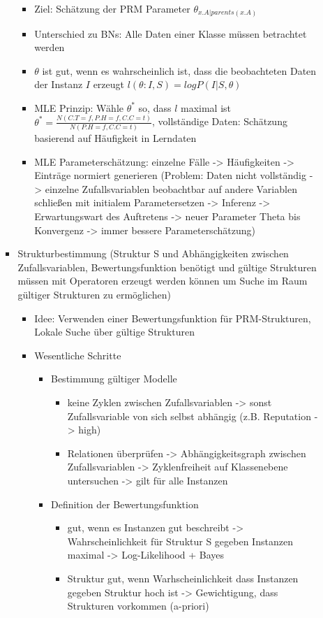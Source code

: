 \documentclass[paper=a4, fontsize=11pt]{scrartcl} %
\numberwithin{equation}{section} %
\numberwithin{figure}{section} %
\numberwithin{table}{section} %
\begin{document}
\begin{itemize}
\begin{itemize}
\begin{itemize}
\begin{itemize}
\item Ziel: Schätzung der PRM Parameter $\theta_{x.A|parents(x.A)}$
\item Unterschied zu BNs: Alle Daten einer Klasse müssen betrachtet werden
\item $\theta$ ist gut, wenn es wahrscheinlich ist, dass die beobachteten Daten der Instanz $I$ erzeugt $l(\theta:I,S) = log P(I|S,\theta)$
\item MLE Prinzip: Wähle $\theta^*$ so, dass $l$ maximal ist $\theta^* = \frac{N(C.T=f,P.H=f,C.C=t)}{N(P.H=f,C.C=t)}$, vollständige Daten: Schätzung basierend auf Häufigkeit in Lerndaten
\item MLE Parameterschätzung: einzelne Fälle -> Häufigkeiten -> Einträge normiert generieren (Problem: Daten nicht vollständig -> einzelne Zufallsvariablen beobachtbar auf andere Variablen schließen mit initialem Parametersetzen -> Inferenz -> Erwartungswart des Auftretens -> neuer Parameter Theta bis Konvergenz -> immer bessere Parameterschätzung)
\end{itemize}
\item Strukturbestimmung (Struktur S und Abhängigkeiten zwischen Zufallsvariablen, Bewertungsfunktion benötigt und gültige Strukturen müssen mit Operatoren erzeugt werden können um Suche im Raum gültiger Strukturen zu ermöglichen)
\begin{itemize}
\item Idee: Verwenden einer Bewertungsfunktion für PRM-Strukturen, Lokale Suche über gültige Strukturen
\item Wesentliche Schritte
\begin{itemize}
\item Bestimmung gültiger Modelle
\begin{itemize}
\item keine Zyklen zwischen Zufallsvariablen -> sonst Zufallsvariable von sich selbst abhängig (z.B. Reputation -> high)
\item Relationen überprüfen -> Abhängigkeitsgraph zwischen Zufallsvariablen -> Zyklenfreiheit auf Klassenebene untersuchen -> gilt für alle Instanzen
\end{itemize}
\item Definition der Bewertungsfunktion
\begin{itemize}
\item gut, wenn es Instanzen gut beschreibt -> Wahrscheinlichkeit für Struktur S gegeben Instanzen maximal -> Log-Likelihood + Bayes
\item Struktur gut, wenn Warhscheinlichkeit dass Instanzen gegeben Struktur hoch ist -> Gewichtigung, dass Strukturen vorkommen (a-priori)

\end{itemize}
\end{itemize}
\end{itemize}
\end{itemize}
\end{itemize}
\end{itemize}
\end{document}
